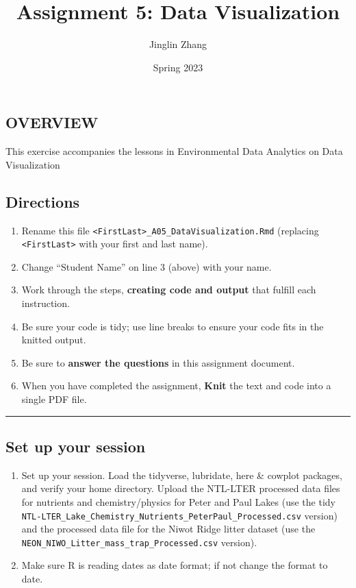 \documentclass[
]{article}
\title{Assignment 5: Data Visualization}
\author{Jinglin Zhang}
\date{Spring 2023}
\providecommand{\tightlist}{%
  \setlength{\itemsep}{0pt}\setlength{\parskip}{0pt}}
\begin{document}
\maketitle

\hypertarget{overview}{%
\subsection{OVERVIEW}\label{overview}}

This exercise accompanies the lessons in Environmental Data Analytics on
Data Visualization

\hypertarget{directions}{%
\subsection{Directions}\label{directions}}

\begin{enumerate}
\def\labelenumi{\arabic{enumi}.}
\tightlist
\item
  Rename this file
  \texttt{\textless{}FirstLast\textgreater{}\_A05\_DataVisualization.Rmd}
  (replacing \texttt{\textless{}FirstLast\textgreater{}} with your first
  and last name).
\item
  Change ``Student Name'' on line 3 (above) with your name.
\item
  Work through the steps, \textbf{creating code and output} that fulfill
  each instruction.
\item
  Be sure your code is tidy; use line breaks to ensure your code fits in
  the knitted output.
\item
  Be sure to \textbf{answer the questions} in this assignment document.
\item
  When you have completed the assignment, \textbf{Knit} the text and
  code into a single PDF file.
\end{enumerate}

\begin{center}\rule{0.5\linewidth}{0.5pt}\end{center}

\hypertarget{set-up-your-session}{%
\subsection{Set up your session}\label{set-up-your-session}}

\begin{enumerate}
\def\labelenumi{\arabic{enumi}.}
\item
  Set up your session. Load the tidyverse, lubridate, here \& cowplot
  packages, and verify your home directory. Upload the NTL-LTER
  processed data files for nutrients and chemistry/physics for Peter and
  Paul Lakes (use the tidy
  \texttt{NTL-LTER\_Lake\_Chemistry\_Nutrients\_PeterPaul\_Processed.csv}
  version) and the processed data file for the Niwot Ridge litter
  dataset (use the
  \texttt{NEON\_NIWO\_Litter\_mass\_trap\_Processed.csv} version).
\item
  Make sure R is reading dates as date format; if not change the format
  to date.
\end{enumerate}
\end{document}
